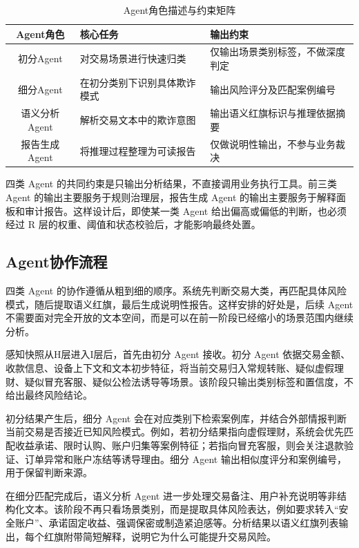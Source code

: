 \documentclass{xduugthesis}
\begin{document}
\begin{table}[H]
    \centering
    \caption{Agent角色描述与约束矩阵}
    \label{tab:agent-constraint}
    \begin{tabular}{|c|p{5cm}|p{5cm}|}
        \hline
        Agent角色 & 核心任务 & 输出约束 \\
        \hline
        初分Agent & 对交易场景进行快速归类 & 仅输出场景类别标签，不做深度判定 \\
        \hline
        细分Agent & 在初分类别下识别具体欺诈模式 & 输出风险评分及匹配案例编号 \\
        \hline
        语义分析Agent & 解析交易文本中的欺诈意图 & 输出语义红旗标识与推理依据摘要 \\
        \hline
        报告生成Agent & 将推理过程整理为可读报告 & 仅做说明性输出，不参与业务裁决 \\
        \hline
    \end{tabular}
\end{table}

四类 Agent 的共同约束是只输出分析结果，不直接调用业务执行工具。前三类 Agent 的输出主要服务于规则治理层，报告生成 Agent 的输出主要服务于解释面板和审计报告。这样设计后，即使某一类 Agent 给出偏高或偏低的判断，也必须经过 R 层的权重、阈值和状态校验后，才能影响最终处置。

\subsection{Agent协作流程}

四类 Agent 的协作遵循从粗到细的顺序。系统先判断交易大类，再匹配具体风险模式，随后提取语义红旗，最后生成说明性报告。这样安排的好处是，后续 Agent 不需要面对完全开放的文本空间，而是可以在前一阶段已经缩小的场景范围内继续分析。

感知快照从H层进入I层后，首先由初分 Agent 接收。初分 Agent 依据交易金额、收款信息、设备上下文和文本初步特征，将当前交易归入常规转账、疑似虚假理财、疑似冒充客服、疑似公检法诱导等场景。该阶段只输出类别标签和置信度，不给出最终风险结论。

初分结果产生后，细分 Agent 会在对应类别下检索案例库，并结合外部情报判断当前交易是否接近已知风险模式。例如，若初分结果指向虚假理财，系统会优先匹配收益承诺、限时认购、账户归集等案例特征；若指向冒充客服，则会关注退款验证、订单异常和账户冻结等诱导理由。细分 Agent 输出相似度评分和案例编号，用于保留判断来源。

在细分匹配完成后，语义分析 Agent 进一步处理交易备注、用户补充说明等非结构化文本。该阶段不再只看场景类别，而是提取具体风险表达，例如要求转入“安全账户”、承诺固定收益、强调保密或制造紧迫感等。分析结果以语义红旗列表输出，每个红旗附带简短解释，说明它为什么可能提升交易风险。
\end{document}
